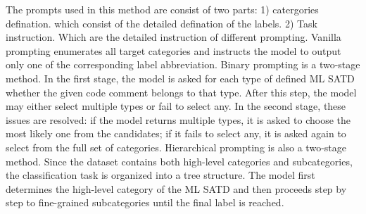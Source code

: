 \documentclass[acmsmall,screen,review,anonymous]{acmart}
\begin{document}
The prompts used in this method are consist of two parts: 1) catergories defination. which consist of the detailed defination of the labels. 2) Task instruction. Which are the detailed instruction of different prompting.  Vanilla prompting enumerates all target categories and instructs the model to output only one of the corresponding label abbreviation. Binary prompting is a two-stage method. In the first stage, the model is asked for each type of defined ML SATD whether the given code comment belongs to that type. After this step, the model may either select multiple types or fail to select any. In the second stage, these issues are resolved: if the model returns multiple types, it is asked to choose the most likely one from the candidates; if it fails to select any, it is asked again to select from the full set of categories. Hierarchical prompting is also a two-stage method. Since the dataset contains both high-level categories and subcategories, the classification task is organized into a tree structure. The model first determines the high-level category of the ML SATD and then proceeds step by step to fine-grained subcategories until the final label is reached. 















\end{document}
